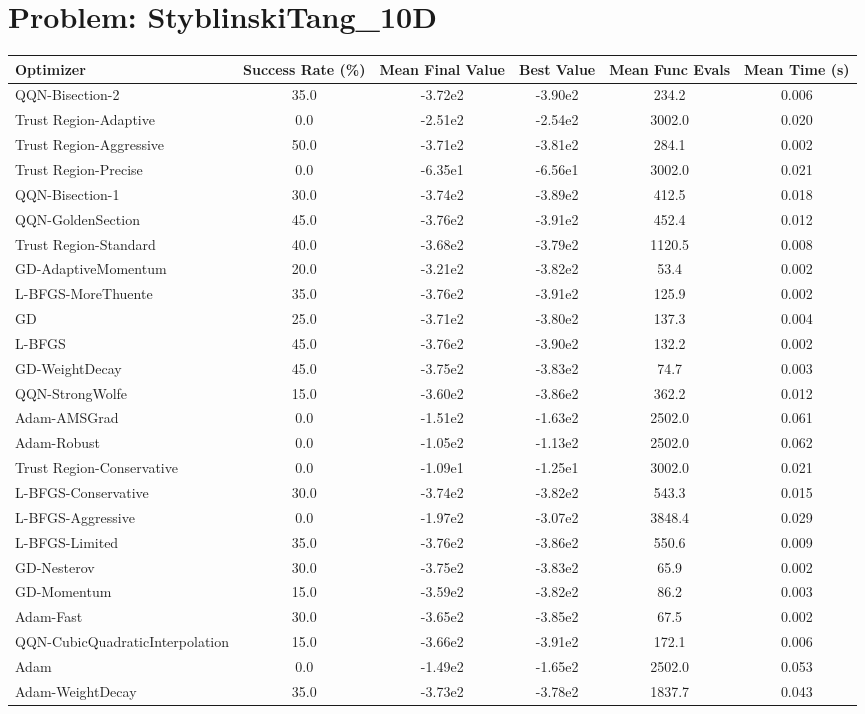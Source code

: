 \documentclass{article}
\begin{document}
\section{Problem: StyblinskiTang\_10D}
\begin{longtable}{p{3cm}*{5}{c}}
\toprule
\textbf{Optimizer} & \textbf{Success Rate (\%)} & \textbf{Mean Final Value} & \textbf{Best Value} & \textbf{Mean Func Evals} & \textbf{Mean Time (s)} \\
\midrule
QQN-Bisection-2 & 35.0 & -3.72e2 & -3.90e2 & 234.2 & 0.006 \\
Trust Region-Adaptive & 0.0 & -2.51e2 & -2.54e2 & 3002.0 & 0.020 \\
Trust Region-Aggressive & 50.0 & -3.71e2 & -3.81e2 & 284.1 & 0.002 \\
Trust Region-Precise & 0.0 & -6.35e1 & -6.56e1 & 3002.0 & 0.021 \\
QQN-Bisection-1 & 30.0 & -3.74e2 & -3.89e2 & 412.5 & 0.018 \\
QQN-GoldenSection & 45.0 & -3.76e2 & -3.91e2 & 452.4 & 0.012 \\
Trust Region-Standard & 40.0 & -3.68e2 & -3.79e2 & 1120.5 & 0.008 \\
GD-AdaptiveMomentum & 20.0 & -3.21e2 & -3.82e2 & 53.4 & 0.002 \\
L-BFGS-MoreThuente & 35.0 & -3.76e2 & -3.91e2 & 125.9 & 0.002 \\
GD & 25.0 & -3.71e2 & -3.80e2 & 137.3 & 0.004 \\
L-BFGS & 45.0 & -3.76e2 & -3.90e2 & 132.2 & 0.002 \\
GD-WeightDecay & 45.0 & -3.75e2 & -3.83e2 & 74.7 & 0.003 \\
QQN-StrongWolfe & 15.0 & -3.60e2 & -3.86e2 & 362.2 & 0.012 \\
Adam-AMSGrad & 0.0 & -1.51e2 & -1.63e2 & 2502.0 & 0.061 \\
Adam-Robust & 0.0 & -1.05e2 & -1.13e2 & 2502.0 & 0.062 \\
Trust Region-Conservative & 0.0 & -1.09e1 & -1.25e1 & 3002.0 & 0.021 \\
L-BFGS-Conservative & 30.0 & -3.74e2 & -3.82e2 & 543.3 & 0.015 \\
L-BFGS-Aggressive & 0.0 & -1.97e2 & -3.07e2 & 3848.4 & 0.029 \\
L-BFGS-Limited & 35.0 & -3.76e2 & -3.86e2 & 550.6 & 0.009 \\
GD-Nesterov & 30.0 & -3.75e2 & -3.83e2 & 65.9 & 0.002 \\
GD-Momentum & 15.0 & -3.59e2 & -3.82e2 & 86.2 & 0.003 \\
Adam-Fast & 30.0 & -3.65e2 & -3.85e2 & 67.5 & 0.002 \\
QQN-CubicQuadraticInterpolation & 15.0 & -3.66e2 & -3.91e2 & 172.1 & 0.006 \\
Adam & 0.0 & -1.49e2 & -1.65e2 & 2502.0 & 0.053 \\
Adam-WeightDecay & 35.0 & -3.73e2 & -3.78e2 & 1837.7 & 0.043 \\
\bottomrule
\end{longtable}
\end{document}
